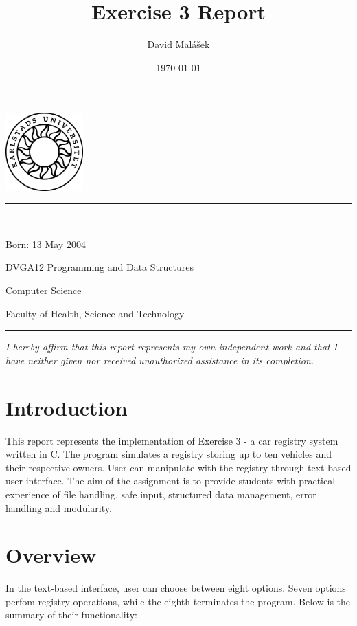 \documentclass[12pt, a4paper]{article}
\title{Exercise 3 Report}
\author{David Malášek}
\date{\today}
\makeatletter
\newcommand{\birthdate}{13 May 2004}
\newcommand{\affirmation}{I hereby affirm that this report represents my own independent work and that I have neither given nor received unauthorized assistance in its completion.}
\renewcommand{\maketitle}{%
  \bgroup\setlength{\parindent}{0pt}
  \begin{flushleft}

  \vspace*{-1cm}
  \noindent\includegraphics[width=3cm]{kaulogo.jpg}
  \vspace{2cm}

  \hrule\vspace{0.5cm}
  \textbf{\Huge\@title}
  \vspace{0.5cm}\hrule
  
  \vspace{0.5cm}
  \@author \\
  Born: \birthdate
  
  \vspace{0.5cm}
  \@date
  
  \vspace{0.5cm}
  DVGA12 Programming and Data Structures
  
  Computer Science
  
  Faculty of Health, Science and Technology
  
  \vspace{0.5cm}\hrule

  \vspace{1.5cm}
  \textit{\affirmation}

  \end{flushleft}
  \egroup
}
\makeatother
\begin{document}
\maketitle  %

\newpage

\tableofcontents  %

\newpage

\section{Introduction}

This report represents the implementation of Exercise 3 - a car registry system written in C. The program simulates a registry storing up to ten vehicles and their respective owners. User can manipulate with the registry through text-based user interface. The aim of the assignment is to provide students with practical experience of file handling, safe input, structured data management, error handling and modularity.

\section{Overview}

In the text-based interface, user can choose between eight options. Seven options perfom registry operations, while the eighth terminates the program. Below is the summary of their functionality:
\end{document}

